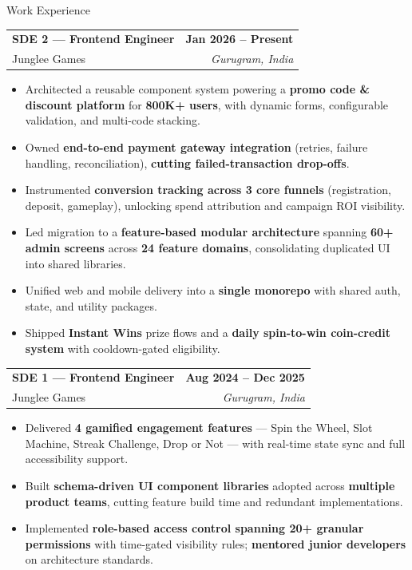 \documentclass{resume}
\begin{document}
\vspace{1pt}
\begin{rSection}{Work Experience}
\vspace{-3pt}

\begin{tabularx}{\textwidth}{@{} X r @{}}
\textbf{SDE 2 --- Frontend Engineer} & \textbf{Jan 2026 -- Present} \\
Junglee Games & \textit{Gurugram, India}
\end{tabularx}
\begin{itemize}[leftmargin=1em,itemsep=-4pt,topsep=2pt]
    \item Architected a reusable component system powering a \textbf{promo code \& discount platform} for \textbf{800K+ users}, with dynamic forms, configurable validation, and multi-code stacking.
    \item Owned \textbf{end-to-end payment gateway integration} (retries, failure handling, reconciliation), \textbf{cutting failed-transaction drop-offs}.
    \item Instrumented \textbf{conversion tracking across 3 core funnels} (registration, deposit, gameplay), unlocking spend attribution and campaign ROI visibility.
    \item Led migration to a \textbf{feature-based modular architecture} spanning \textbf{60+ admin screens} across \textbf{24 feature domains}, consolidating duplicated UI into shared libraries.
    \item Unified web and mobile delivery into a \textbf{single monorepo} with shared auth, state, and utility packages.
    \item Shipped \textbf{Instant Wins} prize flows and a \textbf{daily spin-to-win coin-credit system} with cooldown-gated eligibility.
\end{itemize}
\vspace{2pt}

\begin{tabularx}{\textwidth}{@{} X r @{}}
\textbf{SDE 1 --- Frontend Engineer} & \textbf{Aug 2024 -- Dec 2025} \\
Junglee Games & \textit{Gurugram, India}
\end{tabularx}
\begin{itemize}[leftmargin=1em,itemsep=-4pt,topsep=2pt]
    \item Delivered \textbf{4 gamified engagement features} --- Spin the Wheel, Slot Machine, Streak Challenge, Drop or Not --- with real-time state sync and full accessibility support.
    \item Built \textbf{schema-driven UI component libraries} adopted across \textbf{multiple product teams}, cutting feature build time and redundant implementations.
    \item Implemented \textbf{role-based access control spanning 20+ granular permissions} with time-gated visibility rules; \textbf{mentored junior developers} on architecture standards.
\end{itemize}
\vspace{2pt}


\end{rSection}
\end{document}
